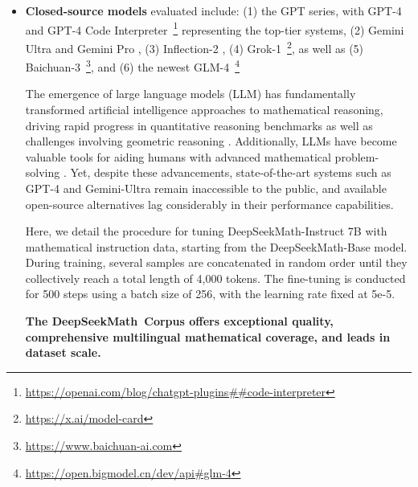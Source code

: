 \begin{itemize}[topsep=0pt]
    \item \textbf{Closed-source models} evaluated include: (1) the GPT series, with GPT-4 \citep{gpt4} and GPT-4 Code Interpreter~\footnote{\url{https://openai.com/blog/chatgpt-plugins\#\#code-interpreter}} representing the top-tier systems, (2) Gemini Ultra and Gemini Pro \citep{gemini}, (3) Inflection-2 \citep{inflection-2}, (4) Grok-1~\footnote{\url{https://x.ai/model-card}}, as well as (5) Baichuan-3~\footnote{\url{https://www.baichuan-ai.com}}, and (6) the newest GLM-4~\footnote{\url{https://open.bigmodel.cn/dev/api\#glm-4}}

The emergence of large language models (LLM) has fundamentally transformed artificial intelligence approaches to mathematical reasoning, driving rapid progress in quantitative reasoning benchmarks \citep{MATH} as well as challenges involving geometric reasoning \citep{trinh2024solving}. Additionally, LLMs have become valuable tools for aiding humans with advanced mathematical problem-solving \citep{tao}. Yet, despite these advancements, state-of-the-art systems such as GPT-4 \citep{gpt4} and Gemini-Ultra \citep{gemini} remain inaccessible to the public, and available open-source alternatives lag considerably in their performance capabilities.

Here, we detail the procedure for tuning DeepSeekMath-Instruct 7B with mathematical instruction data, starting from the DeepSeekMath-Base model. During training, several samples are concatenated in random order until they collectively reach a total length of 4,000 tokens. The fine-tuning is conducted for 500 steps using a batch size of 256, with the learning rate fixed at 5e-5.

\textbf{The DeepSeekMath~Corpus offers exceptional quality, comprehensive multilingual mathematical coverage, and leads in dataset scale.}


\end{itemize}
